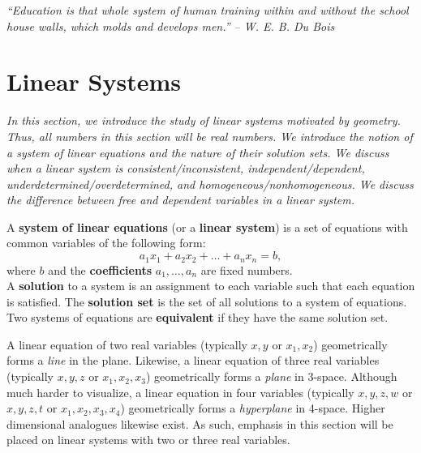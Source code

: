 \begin{center} 
\emph{``Education is that whole system of human training within and without the school house walls, which molds and develops men.'' -- W. E. B. Du Bois}
\end{center}

\section{Linear Systems}\label{sec:linearsystems}
\setlength{\columnsep}{40pt}
\emph{In this section, we introduce the study of linear systems motivated by geometry. Thus, all numbers in this section will be real numbers. We introduce the notion of a system of linear equations and the nature of their solution sets. We discuss when a linear system is consistent/inconsistent, independent/dependent, underdetermined/overdetermined, and homogeneous/nonhomogeneous. We discuss the difference between free and dependent variables in a linear system.}

\begin{Def}\label{def:linearsystem} A \textbf{system of linear equations} (or a \textbf{linear system}) is a set of equations with common variables of the following form:
\[a_1x_1+a_2x_2+\ldots+a_nx_n = b,\] where $b$ and the \textbf{coefficients} $a_1, \ldots, a_n$ are fixed numbers.\\

 A \textbf{solution} to a system is an assignment to each variable such that each equation is satisfied. The \textbf{solution set} is the set of all solutions to a system of equations. Two systems of equations are \textbf{equivalent} if they have the same solution set.
\end{Def}

A linear equation of two real variables (typically $x, y$ or $x_1, x_2$) geometrically forms a \emph{line} in the plane. Likewise, a linear equation of three real variables (typically $x, y, z$ or $x_1, x_2, x_3$) geometrically forms a \emph{plane} in 3-space. Although much harder to visualize, a linear equation in four variables (typically $x, y, z, w$ or $x, y, z, t$ or $x_1, x_2, x_3, x_4$) geometrically forms a \emph{hyperplane} in 4-space. Higher dimensional analogues likewise exist. As such, emphasis in this section will be placed on linear systems with two or three real variables. \\

